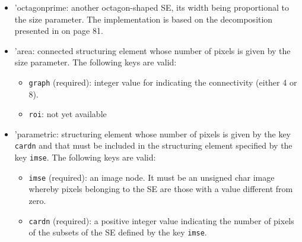 \documentclass{book}
\renewcommand{\SE}{{SE}}
\newcommand{\imsekey}{\mbox{\tt imse}}
\newcommand{\graphkey}{\mbox{\tt graph}}
\newcommand{\cardnkey}{\mbox{\tt cardn}}
\newcommand{\roikey}{\mbox{\tt roi}}
\begin{document}
\begin{itemize}
\item 'octagonprime: another octagon-shaped {\SE}, its width being proportional to the size parameter.   The implementation is based on the decomposition presented in \citep{soille2004sv} on page 81.

\item 'area: connected structuring element whose number of pixels is given by the size parameter.  The following keys are valid:  
\begin{itemize}
\item {\graphkey} (required): integer value for indicating the connectivity (either 4 or 8).
\item \roikey: not yet available
\end{itemize}


\item 'parametric: structuring element whose number of pixels is given by the key {\cardnkey} and that must be included in the structuring element specified by the key \imsekey.  The following keys are valid:
\begin{itemize}
\item {\imsekey} (required): an image node.  It must be an unsigned char image whereby pixels belonging to the {\SE} are those with a value different from zero.
\item {\cardnkey} (required): a positive integer value indicating the number of pixels of the subsets of the {\SE} defined by the key \imsekey.
\end{itemize}

\end{itemize}
\end{document}
